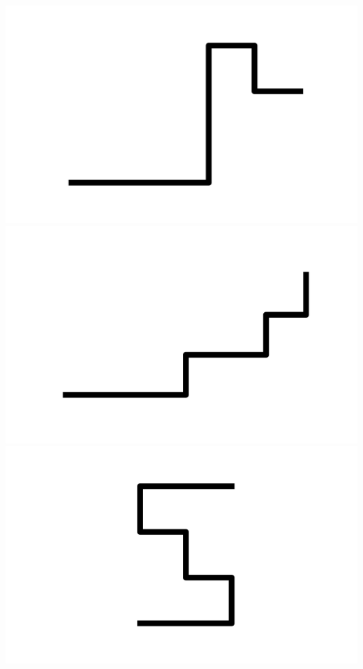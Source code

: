 \documentclass[]{report}
\begin{document}
\includegraphics[scale=.1]{pictures/21/state_cluster_shapes_196.pdf} 
\includegraphics[scale=.1]{pictures/21/state_cluster_shapes_197.pdf} 
\includegraphics[scale=.1]{pictures/21/state_cluster_shapes_198.pdf} 
\end{document}
